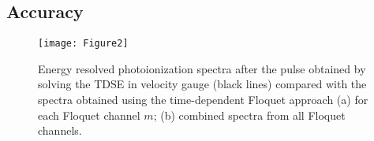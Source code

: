 \documentclass[
pra%
,preprint%
,amssymb, nobibnotes, aps, superscriptaddress, floatfix]{revtex4}
\renewcommand{\imath}{\mathrm{i}}
\begin{document}
%
%
%


\subsection{Accuracy} \label{sec:accuracy}

\begin{figure}
\centering
\texttt{[image: Figure2]}
\caption{Energy resolved photoionization spectra after the pulse obtained by solving the TDSE in velocity gauge (black lines) compared with the spectra obtained using the time-dependent Floquet approach (a) for each Floquet channel $m$; (b) combined spectra from all Floquet channels.}
\label{fig:spectra_benchmark}
\end{figure}
\end{document}
